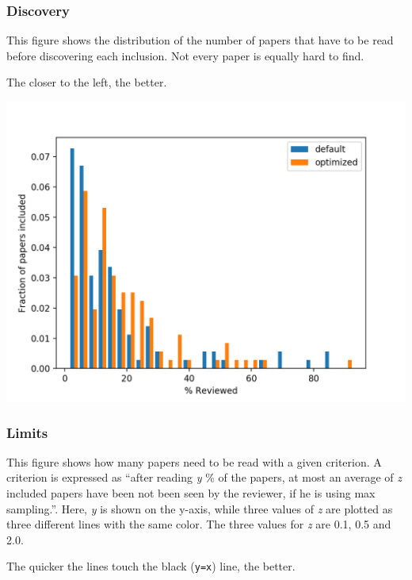 \documentclass[
]{book}
\begin{document}
\pagebreak

\hypertarget{discovery}{%
\subsubsection{Discovery}\label{discovery}}

This figure shows the distribution of the number of papers that have to be read before discovering
each inclusion. Not every paper is equally hard to find.

The closer to the left, the better.

\includegraphics{figs/myfirstsim/Figure_2.png}

\pagebreak

\hypertarget{limits}{%
\subsubsection{Limits}\label{limits}}

This figure shows how many papers need to be read with a given criterion. A criterion is expressed
as ``after reading \emph{y} \% of the papers, at most an average of \emph{z} included papers have been not been
seen by the reviewer, if he is using max sampling.''. Here, \emph{y} is shown on the y-axis, while
three values of \emph{z} are plotted as three different lines with the same color. The three values for
\emph{z} are 0.1, 0.5 and 2.0.

The quicker the lines touch the black (\texttt{y=x}) line, the better.
\end{document}
